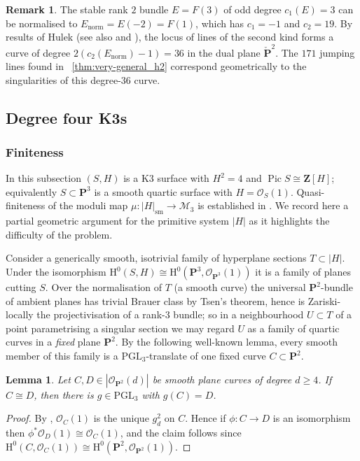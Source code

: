 \documentclass[a4paper,12pt,twoside,reqno]{amsart}
\makeatletter
\numberwithin{equation}{section}
\def\cr@pref#1:#2\@nil{#1}
\newcommand{\cr@tsing}[1]{\@nameuse{cr@map@\cr@pref#1:\@nil}}
\newcommand{\Cref}[1]{\cr@tsing{#1}~\ref{#1}}
\theoremstyle{plain}
\newtheorem{lemma}[theorem]{Lemma}
\theoremstyle{definition}
\newtheorem{remark}[theorem]{Remark}
\DeclareMathOperator{\Pic}{Pic}
\newcommand{\PP}{\mathbf{P}}
\newcommand{\ZZ}{\mathbf{Z}}
\newcommand{\sm}{\mathrm{sm}}
\newcommand{\Pdual}{\check{\PP}^2}
\newcommand{\Mmod}{\mathscr{M}}
\newcommand{\HH}{\mathrm{H}}
\newcommand{\OO}{\mathscr{O}}
\theoremstyle{plain}
\theoremstyle{definition}
\makeatother
\begin{document}
\begin{remark}\label{rem:degree2_vectorbundle}
   The stable rank $2$ bundle $E = F(3)$ of odd degree $c_1(E)=3$ can be normalised to $E_{\mathrm{norm}} = E(-2) = F(1)$, which has $c_1 = -1$ and $c_2 = 19$. By results of Hulek \cite{Hulek} (see also \cite[p.\,119]{OSS} and \cite{DK1, DK2}), the locus of lines of the second kind forms a curve of degree $2(c_2(E_{\mathrm{norm}})-1) = 36$ in the dual plane $\Pdual$. The $171$ jumping lines found in \Cref{thm:very-general_h2} correspond geometrically to the singularities of this degree-$36$ curve.
\end{remark}

\subsection{Degree four K3s}


\subsubsection{Finiteness}

In this subsection $(S,H)$ is a K3 surface with $H^2=4$ and $\Pic S\cong\ZZ[H]$; equivalently $S\subset\PP^3$ is a smooth quartic surface with $H=\OO_S(1)$. Quasi-finiteness of the moduli map $\mu\colon|H|_{\sm}\to\Mmod_3$ is established in \cite{CG}. We record here a partial geometric argument for the primitive system $|H|$ as it highlights the difficulty of the problem.

Consider a generically smooth, isotrivial family of hyperplane sections $T\subset|H|$. Under the isomorphism $\HH^0(S,H)\cong\HH^0(\PP^3,\OO_{\PP^3}(1))$ it is a family of planes cutting $S$. Over the normalisation of $T$ (a smooth curve) the universal $\PP^2$-bundle of ambient planes has trivial Brauer class by Tsen's theorem, hence is Zariski-locally the projectivisation of a rank-$3$ bundle; so in a neighbourhood $U\subset T$ of a point parametrising a singular section we may regard $U$ as a family of quartic curves in a \emph{fixed} plane $\PP^2$. By the following well-known lemma, every smooth member of this family is a $\mathrm{PGL}_3$-translate of one fixed curve $C\subset\PP^2$.

\begin{lemma}\label{lem:quartic-orbit}
    Let $C,D\in|\OO_{\PP^2}(d)|$ be smooth plane curves of degree $d\ge4$. If $C\cong D$, then there is $g\in\mathrm{PGL}_3$ with $g(C)=D$.
\end{lemma}
\begin{proof}
    By \cite[p.~56, Exercise~18]{ACGH}, $\OO_C(1)$ is the unique $g^2_d$ on $C$. Hence if $\phi\colon C\to D$ is an isomorphism then $\phi^*\OO_D(1)\cong\OO_C(1)$, and the claim follows since $\HH^0(C,\OO_C(1))\cong\HH^0(\PP^2,\OO_{\PP^2}(1))$.
\end{proof}
\end{document}
